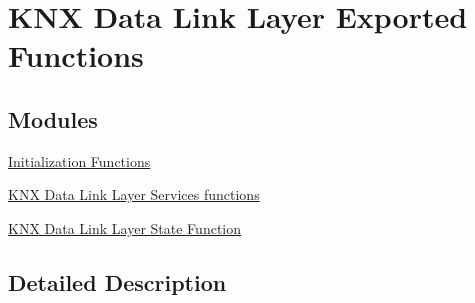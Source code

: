 \hypertarget{group___k_n_x___d_l___exported___functions}{}\section{K\+NX Data Link Layer Exported Functions}
\label{group___k_n_x___d_l___exported___functions}
\subsection*{Modules}
\begin{DoxyCompactItemize}
\item 
\hyperlink{group___k_n_x___d_l___exported___functions___group1}{Initialization Functions}
\item 
\hyperlink{group___k_n_x___d_l___exported___functions___group2}{K\+N\+X Data Link Layer Services functions}
\item 
\hyperlink{group___k_n_x___d_l___exported___functions___group3}{K\+N\+X Data Link Layer State Function}
\end{DoxyCompactItemize}


\subsection{Detailed Description}
